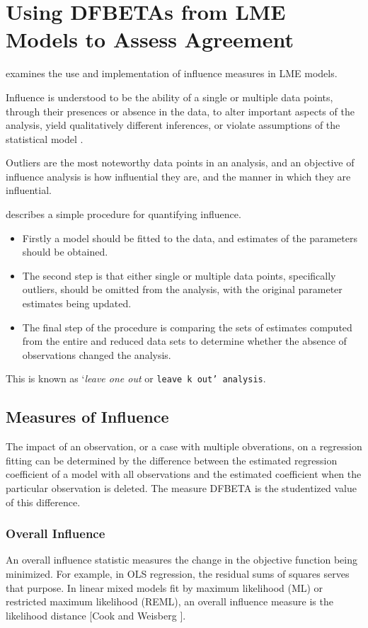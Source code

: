 \documentclass[Main.tex]{subfiles}
\begin{document}
\chapter{Using DFBETAs from LME Models to Assess Agreement}
	
	
	\citet{schab} examines the use and implementation of influence measures in LME models.
	
	Influence is understood to be the ability of a single or multiple data points, through their presences or absence in the data, to alter important aspects of the analysis, yield qualitatively 	different inferences, or violate assumptions of the statistical
	model \citep{schab}.
	
	Outliers are the most noteworthy data points in an analysis, and an objective of influence analysis is how influential they are,
	and the manner in which they are influential.
	
	\citet{schab} describes a simple procedure for quantifying influence.
	\begin{itemize}
		\item Firstly a model should be fitted to the data, and
		estimates of the parameters should be obtained.
		\item The second step is that either single or multiple data points, specifically outliers,
		should be omitted from the analysis, with the original parameter
		estimates being updated.
		\item  The final step of the procedure is comparing the 	sets of estimates computed from the entire and reduced data sets
		to determine whether the absence of observations changed the
		analysis.
	\end{itemize}
	   This is known as `\textit{leave one out} or \texttt{leave k
	out' analysis}.
	

		\section{Measures of Influence} %
		
		The impact of an observation, or a case with multiple obverations, on a regression fitting can be determined by the difference between the estimated regression coefficient of a model with all observations and the estimated coefficient when the particular observation is deleted. The measure DFBETA is the studentized value of this difference.
		
		
		\subsection{Overall Influence}
		An overall influence statistic measures the change in the objective function being minimized. For example, in
		OLS regression, the residual sums of squares serves that purpose. In linear mixed models fit by
		 maximum likelihood (ML) or  restricted maximum likelihood (REML), an overall influence measure is the  likelihood distance [Cook and Weisberg ].
\end{document}
